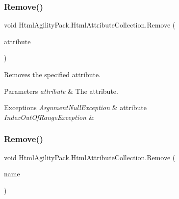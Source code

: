 \subsubsection{\texorpdfstring{Remove()}{Remove()}\hspace{0.1cm}{\footnotesize\ttfamily [2/3]}}
{\footnotesize\ttfamily void Html\+Agility\+Pack.\+Html\+Attribute\+Collection.\+Remove (\begin{DoxyParamCaption}\item[{\hyperlink{class_html_agility_pack_1_1_html_attribute}{Html\+Attribute}}]{attribute }\end{DoxyParamCaption})\hspace{0.3cm}{\ttfamily [inline]}}



Removes the specified attribute. 


\begin{DoxyParams}{Parameters}
{\em attribute} & The attribute.\\
\hline
\end{DoxyParams}

\begin{DoxyExceptions}{Exceptions}
{\em Argument\+Null\+Exception} & attribute\\
\hline
{\em Index\+Out\+Of\+Range\+Exception} & \\
\hline
\end{DoxyExceptions}
\mbox{\label{class_html_agility_pack_1_1_html_attribute_collection_afe1538bf5c2d46b3d9b9cabad36145e1}} 
\subsubsection{\texorpdfstring{Remove()}{Remove()}\hspace{0.1cm}{\footnotesize\ttfamily [3/3]}}
{\footnotesize\ttfamily void Html\+Agility\+Pack.\+Html\+Attribute\+Collection.\+Remove (\begin{DoxyParamCaption}\item[{string}]{name }\end{DoxyParamCaption})\hspace{0.3cm}{\ttfamily [inline]}}



